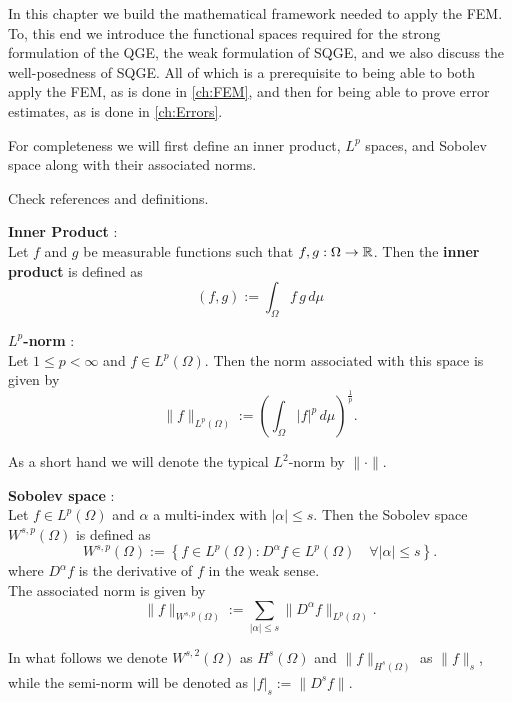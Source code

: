In this chapter we build the mathematical framework needed to apply the FEM. To,
this end we introduce the functional spaces required for the strong formulation
of the QGE, the weak formulation of SQGE, and we also discuss the well-posedness
of SQGE. All of which is a prerequisite to being able to both apply the FEM, as
is done in \autoref{ch:FEM}, and then for being able to prove error estimates,
as is done in \autoref{ch:Errors}.

For completeness we will first define an inner product, $L^p$ spaces, and
Sobolev space along with their associated norms.

{\color{red} {\LARGE Check references and definitions.}
\begin{definition} \label{def:InnerProduct}
  \textbf{Inner Product} \cite{}: \\
  Let $f$ and $g$ be measurable functions such that $f,g : \Omega \rightarrow \mathbb{R}$.
  Then the \textbf{inner product} is defined as
  \begin{equation}
    (f,g) := \int_{\Omega}\! f \, g\, d\mu
    \label{eqn:InnerProduct}
  \end{equation}
\end{definition}

\begin{definition} \label{def:LpNorm}
  \textbf{$L^p$-norm} \cite{}: \\
  Let $1\le p < \infty$ and $f \in L^p(\Omega)$. Then the norm associated with
  this space is given by
  \begin{equation}
    \|f\|_{L^p(\Omega)} := \left(\int_{\Omega}\! |f|^p\, d\mu\right)^{\frac{1}{p}}.
    \label{eqn:LPNorm}
  \end{equation}
\end{definition}
As a short hand we will denote the typical $L^2$-norm by $\|\cdot\|$.

\begin{definition} \label{SobolevSpace}
  \textbf{Sobolev space} \cite{}: \\
  Let $f \in L^p(\Omega)$ and $\alpha$ a multi-index with $|\alpha| \le s$. Then
  the Sobolev space $W^{s,p}(\Omega)$ is defined as
  \begin{equation}
    W^{s,p}(\Omega) := \left\{ f\in L^p(\Omega) : D^{\alpha} f \in
      L^p(\Omega)\quad \forall |\alpha| \le s\right\}.
    \label{eqn:Sobolev}
  \end{equation}
  where $D^{\alpha}f$ is the derivative of $f$ in the weak sense.\\
  The associated norm is given by
  \begin{equation}
    \|f\|_{W^{s,p}(\Omega)} := \sum_{|\alpha|\le s}
      \|D^{\alpha}f\|_{L^p(\Omega)}.
    \label{eqn:HkpNorm}
  \end{equation}
\end{definition}
In what follows we denote $W^{s,2}(\Omega)$ as $H^s(\Omega)$ and
$\|f\|_{H^s(\Omega)}$ as $\|f\|_s$, while the semi-norm will be denoted
as $|f|_s := \|D^s f\|$.}
